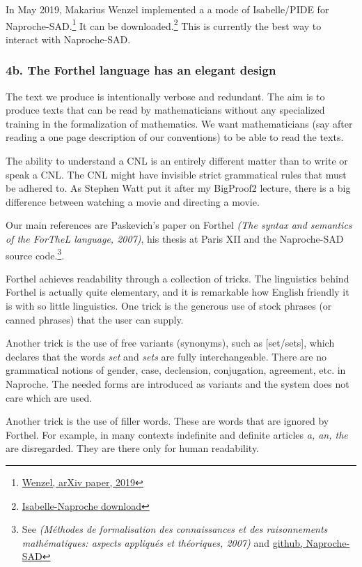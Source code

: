 \documentclass[12pt]{amsart}
\renewcommand{\~}{\ }
\renewcommand{\_}{\textunderscore}
\begin{document}
In May 2019, Makarius Wenzel implemented a a mode of Isabelle/PIDE for
Naproche-SAD.\footnote{\href{https://arxiv.org/pdf/1905.01735.pdf}{Wenzel,
    arXiv paper, 2019}} It can be
downloaded.\footnote{\href{https://files.sketis.net/Isabelle_Naproche-20190418/}{Isabelle-Naproche
    download}} This is currently the best way to interact with
   Naproche-SAD.

\subsubsection*{4b. The Forthel language has an elegant design}

The text we produce is intentionally verbose and redundant.  The aim
is to produce texts that can be read by mathematicians without any
specialized training in the formalization of mathematics.  We want
mathematicians (say after reading a one page description of our
conventions) to be able to read the texts.

The ability to understand a CNL is an entirely different matter than
to write or speak a CNL.  The CNL might have invisible strict
grammatical rules that must be adhered to.  As Stephen Watt put it
after my BigProof2 lecture, there is a big difference between watching
a movie and directing a movie.

Our main references are Paskevich's paper on Forthel {\it (The syntax
  and semantics of the ForTheL language, 2007)}, his thesis at Paris
XII and the Naproche-SAD source code.\footnote{See {\it (M\'ethodes de
    formalisation des connaissances et des raisonnements
    math\'ematiques: aspects appliqu\'es et th\'eoriques, 2007)} and
  \href{https://github.com/Naproche}{github, Naproche-SAD}}.

Forthel achieves readability through a collection of tricks.  The
linguistics behind Forthel is actually quite elementary, and it
is remarkable how English friendly it is with so little linguistics.
One trick is the generous use of stock phrases (or canned phrases)
that the user can supply.

Another trick is the use of free variants (synonyms), such as
[set/sets], which declares that the words {\it set} and {\it sets} are
fully interchangeable.  There are no grammatical notions of gender,
case, declension, conjugation, agreement, etc.  in Naproche.  The
needed forms are introduced as variants and the system does not care
which are used.

Another trick is the use of filler words. These are words that are
ignored by Forthel.  For example, in many contexts indefinite and
definite articles {\it a, an, the} are disregarded.  They are there
only for human readability.
\end{document}
